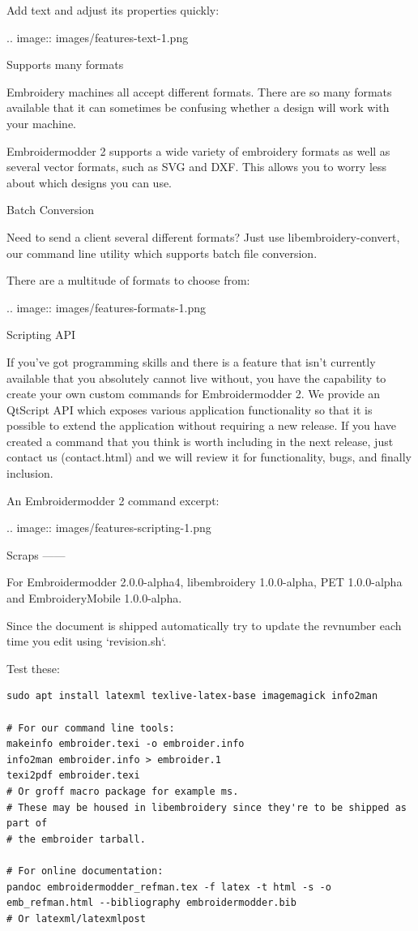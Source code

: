 \documentclass[a4paper]{report}
\begin{document}
Add text and adjust its properties quickly:

.. image::
   images/features-text-1.png

Supports many formats
~~~~~~~~~~~~~~~~~~~~~~

Embroidery machines all accept different formats. There are so many formats
available that it can sometimes be confusing whether a design will work with your machine.

Embroidermodder 2 supports a wide variety of embroidery formats as well as several vector
formats, such as SVG and DXF. This allows you to worry less about which designs you can use.

Batch Conversion
~~~~~~~~~~~~~~~~

Need to send a client several different formats? Just use libembroidery-convert, our command
line utility which supports batch file conversion.

There are a multitude of formats to choose from:

.. image::
   images/features-formats-1.png

Scripting API
~~~~~~~~~~~~~

If you've got programming skills and there is a feature that isn't currently available that you
absolutely cannot live without, you have the capability to create your own custom commands for
Embroidermodder 2. We provide an QtScript API which exposes various application functionality
so that it is possible to extend the application without requiring a new release. If you have
created a command that you think is worth including in the next release, just  contact
us (contact.html) and we will review it for functionality, bugs, and finally inclusion.

An Embroidermodder 2 command excerpt:

.. image::
   images/features-scripting-1.png


Scraps
------

For
Embroidermodder 2.0.0-alpha4, libembroidery 1.0.0-alpha, PET 1.0.0-alpha
and EmbroideryMobile 1.0.0-alpha.

Since the document is shipped automatically try to update the revnumber each
time you edit using `revision.sh`.

Test these:

\begin{lstlisting}
sudo apt install latexml texlive-latex-base imagemagick info2man

# For our command line tools:
makeinfo embroider.texi -o embroider.info
info2man embroider.info > embroider.1
texi2pdf embroider.texi
# Or groff macro package for example ms.
# These may be housed in libembroidery since they're to be shipped as part of
# the embroider tarball.

# For online documentation:
pandoc embroidermodder_refman.tex -f latex -t html -s -o emb_refman.html --bibliography embroidermodder.bib
# Or latexml/latexmlpost
\end{lstlisting}
\end{document}
